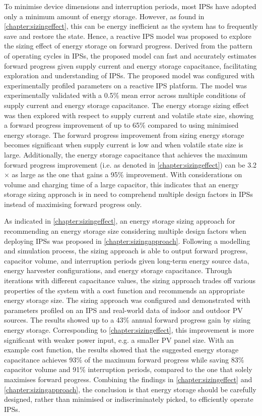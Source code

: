 To minimise device dimensions and interruption periods, most IPSs have adopted only a minimum amount of energy storage. 
However, as found in \cref{chapter:sizingeffect}, this can be energy inefficient as the system has to frequently save and restore the state. 
Hence, a reactive IPS model was proposed to explore the sizing effect of energy storage on forward progress. 
Derived from the pattern of operating cycles in IPSs, the proposed model can fast and accurately estimates forward progress given supply current and energy storage capacitance, facilitating exploration and understanding of IPSs. 
The proposed model was configured with experimentally profiled parameters on a reactive IPS platform.
The model was experimentally validated with a 0.5\% mean error across multiple conditions of supply current and energy storage capacitance. 
The energy storage sizing effect was then explored with respect to supply current and volatile state size, showing a forward progress improvement of up to 65\% compared to using minimised energy storage.
The forward progress improvement from sizing energy storage becomes significant when supply current is low and when volatile state size is large. 
Additionally, the energy storage capacitance that achieves the maximum forward progress improvement (i.e.  as denoted in \cref{chapter:sizingeffect}) can be 3.2$\times$ as large as the one that gains a 95\% improvement. 
With considerations on volume and charging time of a large capacitor, this indicates that an energy storage sizing approach is in need to comprehend multiple design factors in IPSs instead of maximising forward progress only.

As indicated in \cref{chapter:sizingeffect}, an energy storage sizing approach for recommending an energy storage size considering multiple design factors when deploying IPSs was proposed in \cref{chapter:sizingapproach}.
Following a modelling and simulation process, the sizing approach is able to output forward progress, capacitor volume, and interruption periods given long-term energy source data, energy harvester configurations, and energy storage capacitance.
Through iterations with different capacitance values, the sizing approach trades off various properties of the system with a cost function and recommends an appropriate energy storage size. 
The sizing approach was configured and demonstrated with parameters profiled on an IPS and real-world data of indoor and outdoor PV sources. 
The results showed up to a 43\% annual forward progress gain by sizing energy storage.
Corresponding to \cref{chapter:sizingeffect}, this improvement is more significant with weaker power input, e.g. a smaller PV panel size. 
With an example cost function, the results showed that the suggested energy storage capacitance achieves 93\% of the maximum forward progress while saving 83\% capacitor volume and 91\% interruption periods, compared to the one that solely maximises forward progress.
Combining the findings in \cref{chapter:sizingeffect} and \cref{chapter:sizingapproach}, the conclusion is that energy storage should be carefully designed, rather than minimised or indiscriminately picked, to efficiently operate IPSs. 

